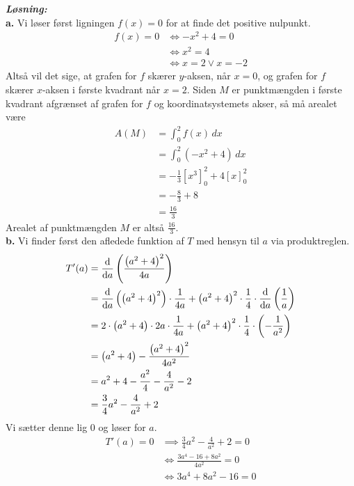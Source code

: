 \documentclass{article}
\newcommand{\sol}{\setlength{\parindent}{0cm}\textbf{\textit{Løsning:}}\setlength{\parindent}{1cm}}
\begin{document}
\sol \\
\textbf{a.}
Vi løser først ligningen $f(x)= 0$ for at finde det positive nulpunkt.
\begin{equation*}
\begin{split}
  f(x)= 0 &\iff -x^2+4=0\\ 
  &\iff x^2=4\\
  &\iff x=2 \lor x=-2
\end{split}
\end{equation*}
Altså vil det sige, at grafen for $f$ skærer $y$-aksen, når $x=0$, og grafen for $f$ skærer $x$-aksen i første kvadrant når $x=2$. 
Siden $M$ er punktmængden i første kvadrant afgrænset af grafen for $f$ og koordinatsystemets akser, så må arealet være
\begin{equation*}
\begin{split}
  A(M)&=\int_{0}^{2} f(x) \,dx \\
  &=\int_{0}^{2} \left( -x^2+4\right) \,dx \\
  &=-\frac{1}{3}\left[x^3\right]_{0}^{2} + 4 \left[x\right]_{0}^{2}\\
  &=-\frac{8}{3}+8\\ 
  &=\frac{16}{3}
\end{split}
\end{equation*}
Arealet af punktmængden $M$ er altså $\frac{16}{3}$.\\[1ex]
\textbf{b.}
Vi finder først den afledede funktion af $T$ med hensyn til $a$ via produktreglen. 
\begin{equation*}
\begin{split}
  T'(a)&=\dv{a} \left(\frac{\left(a^2+4\right)^2}{4a}\right) \\ 
  &=\dv{a} \left(\left(a^2+4\right)^2\right) \cdot \frac{1}{4a} + \left(a^2+4\right)^2 \cdot \frac{1}{4} \cdot \dv{a} \left(\frac{1}{a}\right) \\
  &=2 \cdot \left(a^2+4\right) \cdot 2a \cdot \frac{1}{4a} + \left(a^2+4\right)^2 \cdot \frac{1}{4} \cdot \left(-\frac{1}{a^2}\right)  \\ 
  &=\left(a^2+4\right) -\frac{\left(a^2+4\right)^2}{4a^2}\\ 
  &=a^2+4-\frac{a^2}{4}-\frac{4}{a^2}-2\\ 
  &=\frac{3}{4}a^2-\frac{4}{a^2}+2
\end{split}
\end{equation*}
Vi sætter denne lig 0 og løser for $a$.
\begin{equation*}
\begin{split}
  T'(a)=0 &\implies \frac{3}{4}a^2-\frac{4}{a^2}+2=0\\ 
  &\iff \frac{3a^4-16+8a^2}{4a^2}=0\\
  &\iff 3a^4+8a^2-16=0
\end{split}
\end{equation*}
\end{document}
